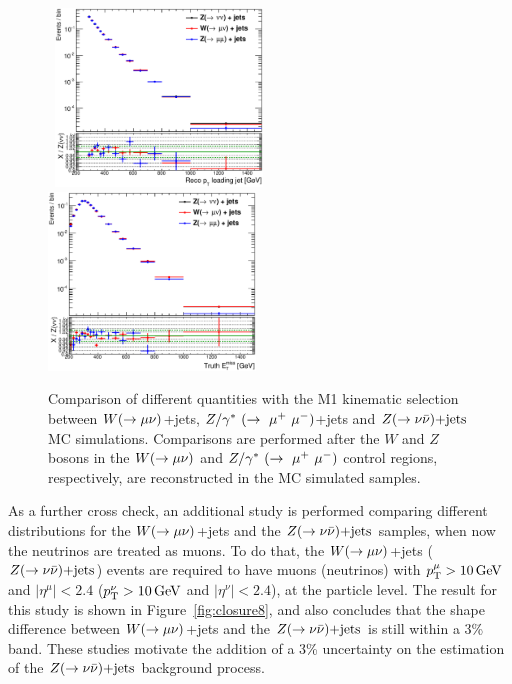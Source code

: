\begin{figure}
\begin{center}
{}
\mbox{
  \includegraphics[width=0.49\textwidth]{Appendix_ClosureTestZnunu/Figures/compareNormalized_pt1_A6_Nom_CRcutsWZ.eps}
  \includegraphics[width=0.49\textwidth]{Appendix_ClosureTestZnunu/Figures/compareNormalized_truth_met_A6_Nom_CRcutsWZ.eps}
}
\end{center}
\caption[Comparison of different quantities with the M1 kinematic selection between $\wmn$+jets, $\zmm$+jets and $\znn$ MC simulations, after the W and Z bosons in the different control regions are reconstructed.]{
Comparison of different quantities with the M1 kinematic selection between $\wmn$+jets, $\zmm$+jets and $\znn$ MC simulations.
Comparisons are performed after the $W$ and $Z$ bosons in the $\wmn$ and $\zmm$ control regions, respectively, are reconstructed in the MC simulated samples.
}
\label{fig:closure5}
\end{figure}

As a further cross check, an additional study is performed comparing different distributions for the $\wmn$+jets and the $\znn$ samples, when now the neutrinos are treated as muons. 
To do that, the $\wmn$+jets ($\znn$) events are required to have muons (neutrinos) with $\pt^{\mu}>\unit[10]{GeV}$ and $|\eta^{\mu}|<2.4$ ($\pt^{\nu}>\unit[10]{GeV}$ and $|\eta^{\nu}|<2.4$), at the particle level.
The result for this study is shown in Figure~\ref{fig:closure8}, and also concludes that the shape difference between $\wmn$+jets and the $\znn$ is still within a 3\% band.
These studies motivate the addition of a 3\% uncertainty on the estimation of the $\znn$ background process.

